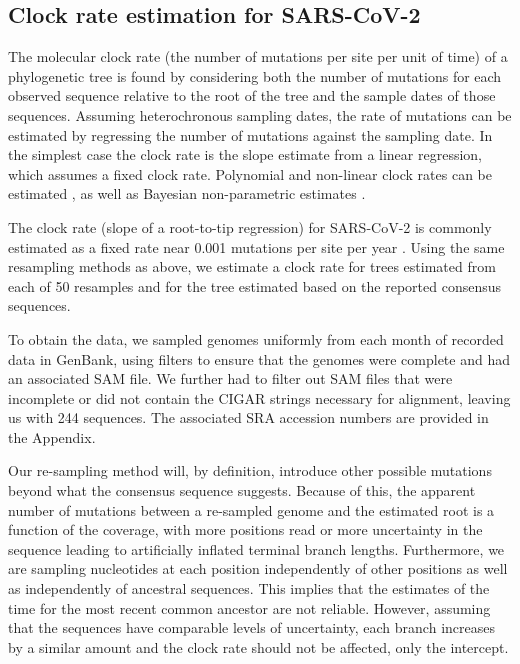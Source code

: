\documentclass[10pt]{article}
\begin{document}
\subsection{Clock rate estimation for SARS-CoV-2}

The molecular clock rate (the number of mutations per site per unit of time) of a phylogenetic tree is found by considering both the number of mutations for each observed sequence relative to the root of the tree and the sample dates of those sequences.
Assuming heterochronous sampling dates, the rate of mutations can be estimated by regressing the number of mutations against the sampling date.
In the simplest case the clock rate is the slope estimate from a linear regression, which assumes a fixed clock rate.
Polynomial and non-linear clock rates can be estimated \citep{sagulenkoTreeTimeMaximumlikelihoodPhylodynamic2018}, as well as Bayesian non-parametric estimates \citep{drummondBayesianEvolutionaryAnalysis2015}. 

The clock rate (slope of a root-to-tip regression) for SARS-CoV-2 is commonly estimated as a fixed rate near 0.001 mutations per site per year \citep{ducheneTemporalSignalPhylodynamic2020, choudharySevereAcuteRespiratory2021, songGenomicEpidemiologySARSCoV22021, niePhylogeneticPhylodynamicAnalyses2020, geidelbergGenomicEpidemiologyDensely2021}.
Using the same resampling methods as above, we estimate a clock rate for trees estimated from each of 50 resamples and for the tree estimated based on the reported consensus sequences.

To obtain the data, we sampled genomes uniformly from each month of recorded data in GenBank, using filters to ensure that the genomes were complete and had an associated SAM file.
We further had to filter out SAM files that were incomplete or did not contain the CIGAR strings necessary for alignment, leaving us with 244 sequences.
The associated SRA accession numbers are provided in the Appendix.

Our re-sampling method will, by definition, introduce other possible mutations beyond what the consensus sequence suggests.
Because of this, the apparent number of mutations between a re-sampled genome and the estimated root is a function of the coverage, with more positions read or more uncertainty in the sequence leading to artificially inflated terminal branch lengths.
Furthermore, we are sampling nucleotides at each position independently of other positions as well as independently of ancestral sequences.
This implies that the estimates of the time for the most recent common ancestor are not reliable.
However, assuming that the sequences have comparable levels of uncertainty, each branch increases by a similar amount and the clock rate should not be affected, only the intercept.
\end{document}
